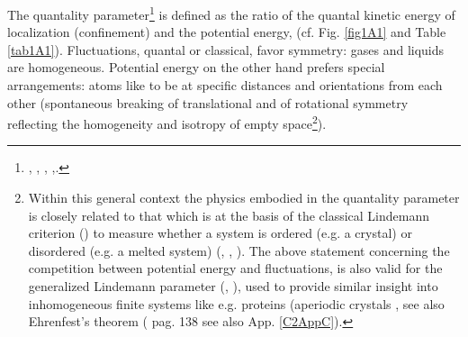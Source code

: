 The quantality parameter\footnote{\cite{Nosanow:76}, \cite{deBoer:57}, \cite{deBoer:48}, \cite{deBoer:48b},\cite{Mottelson:02}.} is defined as the ratio of the quantal kinetic energy of localization (confinement) and the potential energy, (cf. Fig. \ref{fig1A1} and Table \ref{tab1A1}).
 Fluctuations, quantal or classical, favor symmetry: gases and liquids are homogeneous. Potential energy on the other hand prefers special arrangements: atoms like to be at specific distances and orientations from each other (spontaneous breaking of translational and of rotational symmetry reflecting the homogeneity and isotropy of empty space\footnote{Within this general context the physics embodied in the quantality parameter is closely related to that which is at the basis of the classical Lindemann criterion (\cite{Lindemann:10}) to measure whether a system is ordered (e.g. a crystal) or disordered (e.g. a melted system) (\cite{Bilgram:87}, \cite{Lowen:94}, \cite{Stillinger:90,Stillinger:95}). The above statement concerning the competition between potential energy and fluctuations,  is also valid for the generalized Lindemann parameter (\cite{Stillinger:90}, \cite{Zhou:99}), used to provide similar insight into inhomogeneous finite systems like e.g. proteins (aperiodic crystals \cite{Schrodinger:44}, see also Ehrenfest's theorem (\cite{Basdevant:05} pag. 138 see also App. \ref{C2AppC}).}).
 
